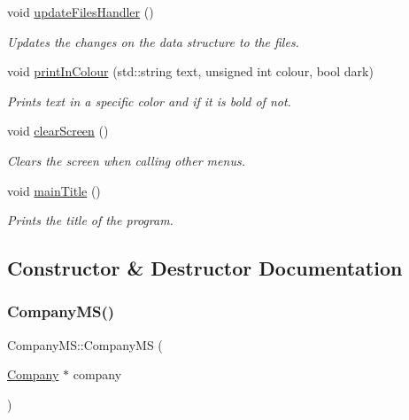 \begin{DoxyCompactItemize}
\mbox{\label{class_company_m_s_a915f059aca9f60bf25485444afa24386}} 
void \hyperlink{class_company_m_s_a915f059aca9f60bf25485444afa24386}{update\+Files\+Handler} ()
\begin{DoxyCompactList}\small\item\em Updates the changes on the data structure to the files. \end{DoxyCompactList}\item 
void \hyperlink{class_company_m_s_add31caead466fc75331b5ec7300ad718}{print\+In\+Colour} (std\+::string text, unsigned int colour, bool dark)
\begin{DoxyCompactList}\small\item\em Prints text in a specific color and if it is bold of not. \end{DoxyCompactList}\item 
\mbox{\label{class_company_m_s_a822c5d3068c92589e92795474b5605c4}} 
void \hyperlink{class_company_m_s_a822c5d3068c92589e92795474b5605c4}{clear\+Screen} ()
\begin{DoxyCompactList}\small\item\em Clears the screen when calling other menus. \end{DoxyCompactList}\item 
\mbox{\label{class_company_m_s_a23359af7cfd2aa5c917be62cc6907692}} 
void \hyperlink{class_company_m_s_a23359af7cfd2aa5c917be62cc6907692}{main\+Title} ()
\begin{DoxyCompactList}\small\item\em Prints the title of the program. \end{DoxyCompactList}\end{DoxyCompactItemize}


\subsection{Constructor \& Destructor Documentation}
\mbox{\label{class_company_m_s_afc748771e6feb5ac47d3714ccda5bfea}} 
\subsubsection{\texorpdfstring{Company\+M\+S()}{CompanyMS()}}
{\footnotesize\ttfamily Company\+M\+S\+::\+Company\+MS (\begin{DoxyParamCaption}\item[{\hyperlink{class_company}{Company} $\ast$}]{company }\end{DoxyParamCaption})}



